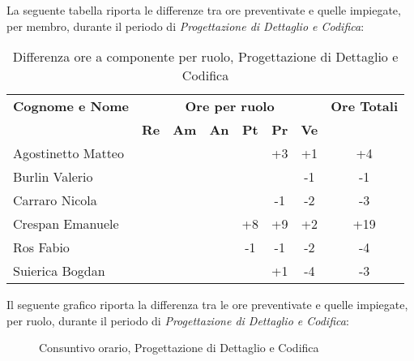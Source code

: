 \noindent La seguente tabella riporta le differenze tra ore preventivate e quelle impiegate, per membro, durante il periodo di \textit{Progettazione di Dettaglio e Codifica}: 
\begin{table}[h]
	\centering
	\begin{tabular}{|l|c|c|c|c|c|c|c|}
		\toprule
		\textbf{Cognome e Nome} & \multicolumn{6}{c}{\textbf{Ore per ruolo}} & \textbf{Ore Totali} \\
		& \textbf{Re} & \textbf{Am} & \textbf{An} & \textbf{Pt} & \textbf{Pr} & \textbf{Ve} & \\
		
		\midrule
		Agostinetto Matteo & & & & & +3 & +1 & +4 \\
		Burlin Valerio & & & & & & -1 & -1 \\ 
		Carraro Nicola & & & & & -1 & -2 & -3 \\
		Crespan Emanuele & & & & +8 & +9 & +2 & +19 \\
		Ros Fabio & & & & -1 & -1 & -2 & -4 \\
		Suierica Bogdan & & & & & +1 & -4 & -3 \\
		
		\bottomrule
	\end{tabular}
	\caption{Differenza ore a componente per ruolo, Progettazione di Dettaglio e Codifica}
\end{table}

\newpage
\noindent Il seguente grafico riporta la differenza tra le ore preventivate e quelle impiegate, per ruolo, durante il periodo di \textit{Progettazione di Dettaglio e Codifica}:
\begin{figure}[h]
	\centering
	\caption{Consuntivo orario, Progettazione di Dettaglio e Codifica}
\end{figure}

